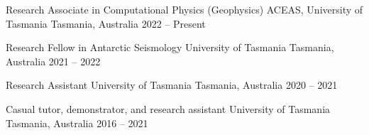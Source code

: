\documentclass[11pt, a4paper]{cvClass}
\begin{document}
\begin{cventries}
  \cventry
    {Research Associate in Computational Physics (Geophysics)}
    {ACEAS, University of Tasmania}
    {Tasmania, Australia}
    {2022 -- Present}
    {}

  \cventry
    {Research Fellow in Antarctic Seismology}
    {University of Tasmania}
    {Tasmania, Australia}
    {2021 -- 2022}
    {}

  \cventry
    {Research Assistant}
    {University of Tasmania}
    {Tasmania, Australia}
    {2020 -- 2021}
    {}

  \cventry
    {Casual tutor, demonstrator, and research assistant}
    {University of Tasmania}
    {Tasmania, Australia}
    {2016 -- 2021}
    {}
\end{cventries}

\end{document}
